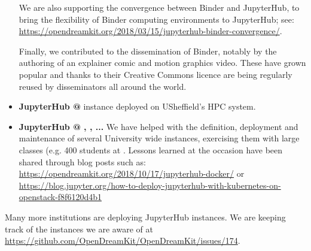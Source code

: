 \begin{itemize}

  We are also supporting the convergence between Binder and
  JupyterHub, to bring the flexibility of Binder computing
  environments to JupyterHub; see:
  \url{https://opendreamkit.org/2018/03/15/jupyterhub-binder-convergence/}.

  Finally, we contributed to the dissemination of Binder, notably by
  the authoring of an explainer comic and motion graphics video. These
  have grown popular and thanks to their Creative Commons licence are
  being regularly reused by disseminators all around the world.

\item \textbf{JupyterHub @ }
  \href{http://docs.iceberg.shef.ac.uk/en/latest/using-iceberg/accessing/jupyterhub.html}{\JupyterHub}
  instance deployed on USheffield's HPC system.

\item \textbf{JupyterHub @ , , ...} We have helped
  with the definition, deployment and maintenance of several
  University wide instances, exercising them with large classes (e.g.
  400 students at . Lessons learned at the occasion have been
  shared through blog posts such as:
  \url{https://opendreamkit.org/2018/10/17/jupyterhub-docker/} or
  \url{https://blog.jupyter.org/how-to-deploy-jupyterhub-with-kubernetes-on-openstack-f8f6120d4b1}
\end{itemize}

Many more institutions are deploying JupyterHub instances. We are
keeping track of the instances we are aware of at
\url{https://github.com/OpenDreamKit/OpenDreamKit/issues/174}.

